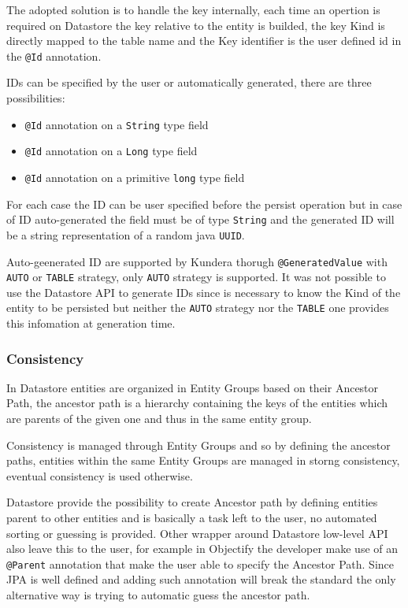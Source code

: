 \newparagraph The adopted solution is to handle the key internally, each time an opertion is required on Datastore the key relative to the entity is builded, the key Kind is directly mapped to the table name and the Key identifier is the user defined id in the \texttt{@Id} annotation.

\noindent IDs can be specified by the user or automatically generated, there are three possibilities:
\begin{itemize}
\item \texttt{@Id} annotation on a \texttt{String} type field
\item \texttt{@Id} annotation on a \texttt{Long} type field
\item \texttt{@Id} annotation on a primitive \texttt{long} type field
\end{itemize}
For each case the ID can be user specified before the persist operation but in case of ID auto-generated the field must be of type \texttt{String} and the generated ID will be a string representation of a random java \texttt{UUID}.

\noindent Auto-geenerated ID are supported by Kundera thorugh \texttt{@GeneratedValue} with \texttt{AUTO} or \texttt{TABLE} strategy, only \texttt{AUTO} strategy is supported. 
It was not possible to use the Datastore API to generate IDs since is necessary to know the Kind of the entity to be persisted but neither the \texttt{AUTO} strategy nor the \texttt{TABLE} one provides this infomation at generation time.

\subsubsection{Consistency}
In Datastore entities are organized in Entity Groups based on their Ancestor Path, the ancestor path is a hierarchy containing the keys of the entities which are parents of the given one and thus in the same entity group.

\noindent Consistency is managed through Entity Groups and so by defining the ancestor paths, entities within the same Entity Groups are managed in storng consistency, eventual consistency is used otherwise.

\noindent Datastore provide the possibility to create Ancestor path by defining entities parent to other entities and is basically a task left to the user, no automated sorting or guessing is provided. Other wrapper around Datastore low-level API also leave this to the user, for example in Objectify \cite{online:objectify} the developer make use of an \texttt{@Parent} annotation that make the user able to specify the Ancestor Path.
Since JPA is well defined and adding such annotation will break the standard the only alternative way is trying to automatic guess the ancestor path.

